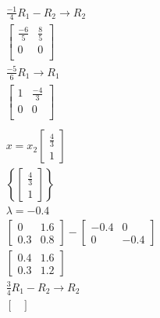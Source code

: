 \documentclass[12pt letter]{report}
\begin{document}
{\begin{enumerate}
\begin{align*}
            \frac{-1}{4}R_1 - R_2  \rightarrow R_2                                   \\
            \begin{bmatrix}
              \frac{-6}{5} & \frac{8}{5} \\
              0            & 0           \\
            \end{bmatrix}
            \\
            \frac{-5}{6}R_1 \to R_1                                                  \\
            \begin{bmatrix}
              1 & \frac{-4}{3} \\
              0 & 0            \\
            \end{bmatrix}
            \\
            \\
            x = x_2\begin{bmatrix} \frac{4}{3} \\ 1 \end{bmatrix}                    \\
            \left\{ \begin{bmatrix} \frac{4}{3} \\ 1 \end{bmatrix} \right\}
            \\
            \lambda = -0.4                                                           \\
            \begin{bmatrix}
              0   & 1.6 \\
              0.3 & 0.8
            \end{bmatrix} - \begin{bmatrix} -0.4 & 0 \\ 0 & -0.4 \end{bmatrix}       \\
            \begin{bmatrix}
              0.4 & 1.6 \\
              0.3 & 1.2
            \end{bmatrix}                                                           \\
            \frac{3}{4}R_1 - R_2  \rightarrow R_2                                    \\
            \begin{bmatrix}

\end{bmatrix}
\end{align*}
\end{enumerate}}
\end{document}
